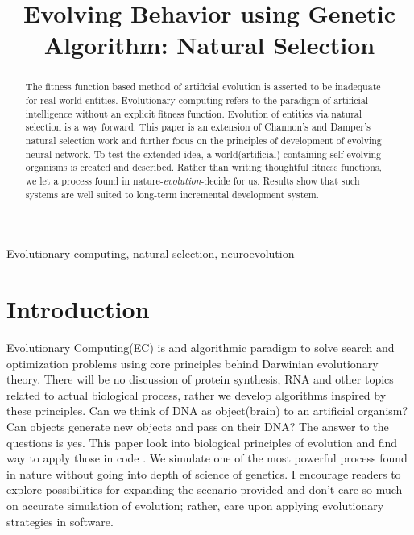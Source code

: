 \documentclass[conference]{IEEEtran}
\begin{document}
\title{Evolving Behavior using Genetic Algorithm: Natural Selection\\
}

\author{
\and
{}
}

\maketitle

\begin{abstract}
The fitness function based method of artificial evolution is asserted to be inadequate for real world entities. Evolutionary computing refers to the paradigm of artificial intelligence without an explicit fitness function. Evolution of entities via natural selection is a way forward.
This paper is an extension of Channon's and Damper's natural selection work and further focus on the principles of development of evolving neural network. To test the extended idea, a world(artificial) containing self evolving organisms is created and described. Rather than writing thoughtful fitness functions, we let a process found in nature-{\textit{evolution}}-decide for us. Results show that such systems are well suited to long-term incremental development system.
\end{abstract}

\begin{IEEEkeywords}
Evolutionary computing, natural selection, neuroevolution
\end{IEEEkeywords}

\section{Introduction}
Evolutionary Computing(EC)\cite{evolvable-machines} is and algorithmic paradigm to solve search and optimization problems using core principles behind Darwinian evolutionary theory. There will be no discussion of protein synthesis, RNA and other topics related to actual biological process, rather we develop algorithms inspired by these principles. Can we think of DNA as  object(brain) to an artificial organism?\cite{Stanley} Can objects generate new objects and pass on their DNA? The answer to the questions is yes. This paper look into biological principles of evolution and find way to apply those in code \cite{algorithms-and-experiments}. We simulate one of the most powerful process found in nature without going into depth of science of genetics. I encourage readers to explore possibilities for expanding the scenario provided and don't care so much on accurate simulation of evolution; rather, care upon applying evolutionary strategies in software.
\end{document}
